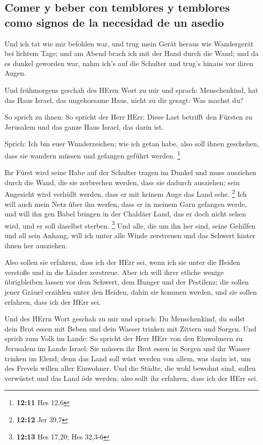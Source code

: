 \hypertarget{comer-y-beber-con-temblores-y-temblores-como-signos-de-la-necesidad-de-un-asedio}{%
\subsection{Comer y beber con temblores y temblores como signos de la
necesidad de un
asedio}\label{comer-y-beber-con-temblores-y-temblores-como-signos-de-la-necesidad-de-un-asedio}}

 Und ich tat wie mir befohlen war, und trug mein Gerät
heraus wie Wandergerät bei lichtem Tage; und am Abend brach ich mit der
Hand durch die Wand; und da es dunkel geworden war, nahm ich's auf die
Schulter und trug's hinaus vor ihren Augen.

 Und frühmorgens geschah des HErrn Wort zu mir und sprach:
 Menschenkind, hat das Haus Israel, das ungehorsame Haus,
nicht zu dir gesagt: Was machst du?

 So sprich zu ihnen: So spricht der Herr HErr: Diese Last
betrifft den Fürsten zu Jerusalem und das ganze Haus Israel, das darin
ist.

 Sprich: Ich bin euer Wunderzeichen; wie ich getan habe,
also soll ihnen geschehen, dass sie wandern müssen und gefangen geführt
werden. \footnote{\textbf{12:11} Hes 12,6}

 Ihr Fürst wird seine Habe auf der Schulter tragen im
Dunkel und muss ausziehen durch die Wand, die sie zerbrechen werden,
dass sie dadurch ausziehen; sein Angesicht wird verhüllt werden, dass er
mit keinem Auge das Land sehe. \footnote{\textbf{12:12} Jer 39,7}
 Ich will auch mein Netz über ihn werfen, dass er in
meinem Garn gefangen werde, und will ihn gen Babel bringen in der
Chaldäer Land, das er doch nicht sehen wird, und er soll daselbst
sterben. \footnote{\textbf{12:13} Hes 17,20; Hes 32,3-6} 
Und alle, die um ihn her sind, seine Gehilfen und all sein Anhang, will
ich unter alle Winde zerstreuen und das Schwert hinter ihnen her
ausziehen.

 Also sollen sie erfahren, dass ich der HErr sei, wenn
ich sie unter die Heiden verstoße und in die Länder zerstreue.
 Aber ich will ihrer etliche wenige übrigbleiben lassen
vor dem Schwert, dem Hunger und der Pestilenz; die sollen jener Gräuel
erzählen unter den Heiden, dahin sie kommen werden, und sie sollen
erfahren, dass ich der HErr sei.

 Und des HErrn Wort geschah zu mir und sprach:
 Du Menschenkind, du sollst dein Brot essen mit Beben und
dein Wasser trinken mit Zittern und Sorgen.  Und sprich
zum Volk im Lande: So spricht der Herr HErr von den Einwohnern zu
Jerusalem im Lande Israel: Sie müssen ihr Brot essen in Sorgen und ihr
Wasser trinken im Elend; denn das Land soll wüst werden von allem, was
darin ist, um des Frevels willen aller Einwohner.  Und
die Städte, die wohl bewohnt sind, sollen verwüstet und das Land öde
werden; also sollt ihr erfahren, dass ich der HErr sei.

